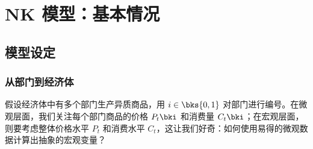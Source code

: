 

\ChapterGeometry

\chapter{NK 模型：基本情况}\label{ch:08}

\section{模型设定}

\subsection{从部门到经济体}

假设经济体中有多个部门生产异质商品，用 \(i\in\bks{0,1}\) 对部门进行编号。在微观层面，我们关注每个部门商品的价格 \(P_t\bki\) 和消费量 \(C_t\bki\)；在宏观层面，则要考虑整体价格水平 \(P_t\) 和消费水平 \(C_t\)，这让我们好奇：如何使用易得的微观数据计算出抽象的宏观变量？

